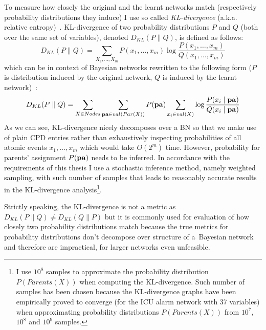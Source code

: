 \documentclass[english,cover]{fitthesis} %
\newcommand{\term}[1]{\emph{#1}}           %
\newcommand{\vars}[1]{{\bold{#1}}}         %
\begin{document}
To measure how closely the original and the learnt networks match (respectively probability distributions they induce) I use so called \term{KL-divergence} (a.k.a. relative entropy)~\cite{pgm}. KL-divergence of two probability distributions $P$ and $Q$ (both over the same set of variables), denoted $D_{KL}(P \parallel Q)$, is defined as follows:
\begin{equation*}
D_{KL}(P \parallel Q) = \sum_{X_1,\dots,X_m} P(x_1,\dots,x_m) \log \frac{P(x_1,\dots,x_m)}{Q(x_1,\dots,x_m)}
\end{equation*}
which can be in context of Bayesian networks rewritten to the following form ($P$ is distribution induced by the original network, $Q$ is induced by the learnt network)~\cite[p.~273]{pgm}:
\begin{equation*}
D_{KL}(P \parallel Q) = \sum_{X \in Nodes} \sum_{\vars{pa} \in val(Par(X))} P(\vars{pa}) \sum_{x_i \in val(X)} \log \frac{P(x_i \mid \vars{pa})}{Q(x_i \mid \vars{pa})}
\end{equation*}
As we can see, KL-divergence nicely decomposes over a BN so that we make use of plain CPD entries rather than exhaustively inspecting probabilities of all atomic events $x_1, \dots, x_m$ which would take $O(2^m)$ time. However, probability for parents' assignment $P(\vars{pa})$ needs to be inferred. In accordance with the requirements of this thesis I use a stochastic inference method, namely weighted sampling, with such number of samples that leads to reasonably accurate results in the KL-divergence analysis\footnote{I use $10^8$ samples to approximate the probability distribution $P(Parents(X))$ when computing the KL-divergence. Such number of samples has been chosen because the KL-divergence graphs have been empirically proved to converge (for the ICU alarm network with 37 variables) when approximating probability distributions $P(Parents(X))$ from $10^7$, $10^8$ and $10^9$ samples.}.

Strictly speaking, the KL-divergence is not a metric as $D_{KL}(P \parallel Q) \neq D_{KL}(Q \parallel P)$ but it is commonly used for evaluation of how closely two probability distributions match because the true metrics for probability distributions don't decompose over structure of a~Bayesian network and therefore are impractical, for larger networks even unfeasible.
\end{document}
